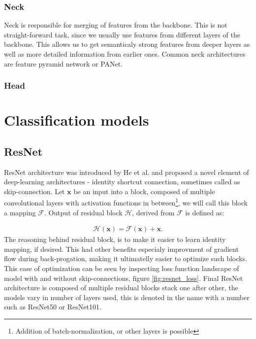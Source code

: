 \subsubsection{Neck}
Neck is responsible for merging of features from the backbone. This is not straight-forward task, since we usually use features from different layers of the backbone. This allows us to get semanticaly strong features from deeper layers as well as more detailed information from earlier ones. Common neck architectures are feature pyramid network or PANet.

\subsubsection{Head}

\section{Classification models}
\subsection{ResNet}
ResNet architecture was introduced by He et al. \cite{He2015} and proposed a novel element of deep-learning architectures - identity shortcut connection, sometimes called as skip-connection. Let $\mathbf{x}$ be an input into a block, composed of multiple convolutional layers with activation functions in between\footnote{Addition of batch-normalization, or other layers is possible}, we will call this block a mapping $\mathcal{F}$. Output of residual block $\mathcal{H}$, derived from $\mathcal{F}$ is defined as:

\begin{align}
    \mathcal{H}\left(\mathbf{x}\right) = \mathcal{F} \left(\mathbf{x}\right) + \mathbf{x}.
\end{align}
The reasoning behind residual block, is to make it easier to learn identity mapping, if desired. This had other benefits especialy improvment of gradient flow during back-progation, making it ultimatelly easier to optimize such blocks. This ease of optimization can be seen by inspecting loss function landscape of model with and without skip-connections, figure \ref{fig:resnet_loss}.
Final ResNet architecture is composed of multiple residual blocks stack one after other, the models vary in number of layers used, this is denoted in the name with a number such as ResNet50 or ResNet101.

